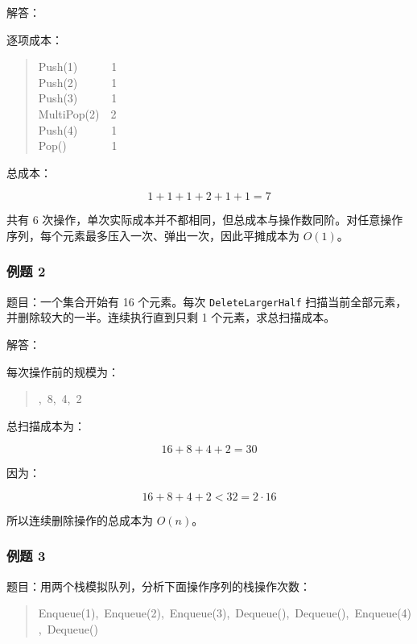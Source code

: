 \documentclass[UTF8,zihao=-4]{ctexart}
\begin{document}
解答：

逐项成本：

\begin{quote}
\small\ttfamily\raggedright
\relax Push(1)\ \ \ \ \ \ 1\\
\relax Push(2)\ \ \ \ \ \ 1\\
\relax Push(3)\ \ \ \ \ \ 1\\
\relax MultiPop(2)\ \ 2\\
\relax Push(4)\ \ \ \ \ \ 1\\
\relax Pop()\ \ \ \ \ \ \ \ 1\\
\end{quote}

总成本：

\[1 + 1 + 1 + 2 + 1 + 1 = 7\]

共有 6 次操作，单次实际成本并不都相同，但总成本与操作数同阶。对任意操作序列，每个元素最多压入一次、弹出一次，因此平摊成本为 $O(1)$。

\subsubsection*{例题 2}

题目：一个集合开始有 16 个元素。每次 \texttt{DeleteLargerHalf} 扫描当前全部元素，并删除较大的一半。连续执行直到只剩 1 个元素，求总扫描成本。

解答：

每次操作前的规模为：

\begin{quote}
\small\ttfamily\raggedright
{},\ 8,\ 4,\ 2\\
\end{quote}

总扫描成本为：

\[16 + 8 + 4 + 2 = 30\]

因为：

\[16 + 8 + 4 + 2 < 32 = 2\cdot 16\]

所以连续删除操作的总成本为 $O(n)$。

\subsubsection*{例题 3}

题目：用两个栈模拟队列，分析下面操作序列的栈操作次数：

\begin{quote}
\small\ttfamily\raggedright
\relax Enqueue(1),\ Enqueue(2),\ Enqueue(3),\ Dequeue(),\ Dequeue(),\ Enqueue(4),\ Dequeue()\\
\end{quote}
\end{document}
